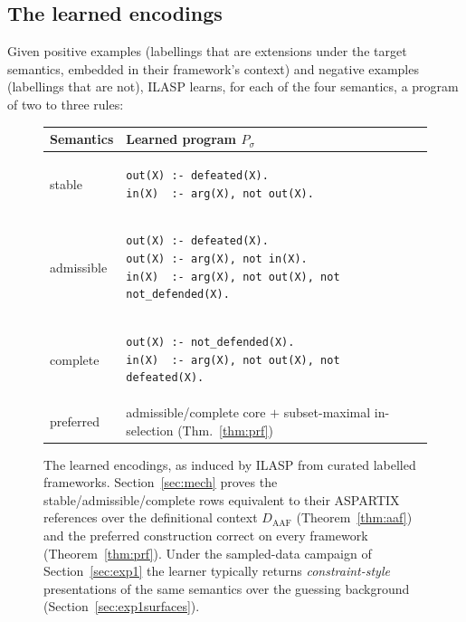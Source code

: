 \documentclass[review,12pt]{elsarticle}
\theoremstyle{definition}
\theoremstyle{remark}
\newcommand{\pred}[1]{\textsf{#1}}
\newcommand{\Daaf}{D_{\mathrm{AAF}}}
\begin{document}
\subsection{The learned encodings}
\label{sec:learnedenc}

Given positive examples (labellings that are extensions under the target
semantics, embedded in their framework's context) and negative examples
(labellings that are not), ILASP learns, for each of the four semantics, a
program of two to three rules:

\begin{figure}[t]
\centering
\small
\begin{tabular}{ll}
\toprule
Semantics & Learned program $P_\sigma$\\
\midrule
stable &
\begin{minipage}[t]{0.75\linewidth}\begin{verbatim}
out(X) :- defeated(X).
in(X)  :- arg(X), not out(X).
\end{verbatim}\end{minipage}\\
admissible &
\begin{minipage}[t]{0.75\linewidth}\begin{verbatim}
out(X) :- defeated(X).
out(X) :- arg(X), not in(X).
in(X)  :- arg(X), not out(X), not not_defended(X).
\end{verbatim}\end{minipage}\\
complete &
\begin{minipage}[t]{0.75\linewidth}\begin{verbatim}
out(X) :- not_defended(X).
in(X)  :- arg(X), not out(X), not defeated(X).
\end{verbatim}\end{minipage}\\
preferred &
admissible/complete core $+$ subset-maximal \pred{in}-selection
(Thm.~\ref{thm:prf})\\
\bottomrule
\end{tabular}
\caption{The learned encodings, as induced by ILASP from curated labelled
frameworks. Section~\ref{sec:mech} proves the stable/admissible/complete rows
equivalent to their ASPARTIX references over the definitional context $\Daaf$
(Theorem~\ref{thm:aaf}) and the preferred construction correct on every
framework (Theorem~\ref{thm:prf}). Under the sampled-data campaign
of Section~\ref{sec:exp1} the learner typically returns \emph{constraint-style}
presentations of the same semantics over the guessing background
(Section~\ref{sec:exp1surfaces}).}
\label{fig:learned}
\end{figure}
\end{document}
